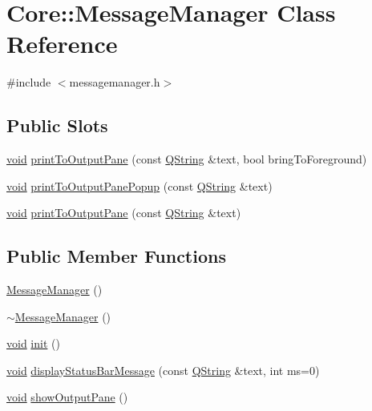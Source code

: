 \hypertarget{class_core_1_1_message_manager}{\section{\-Core\-:\-:\-Message\-Manager \-Class \-Reference}
\label{class_core_1_1_message_manager}
}


{\ttfamily \#include $<$messagemanager.\-h$>$}

\subsection*{\-Public \-Slots}
\begin{DoxyCompactItemize}
\item 
\hyperlink{group___u_a_v_objects_plugin_ga444cf2ff3f0ecbe028adce838d373f5c}{void} \hyperlink{group___core_plugin_ga909deae01f2b3748fe8ac76443102d32}{print\-To\-Output\-Pane} (const \hyperlink{group___u_a_v_objects_plugin_gab9d252f49c333c94a72f97ce3105a32d}{\-Q\-String} \&text, bool bring\-To\-Foreground)
\item 
\hyperlink{group___u_a_v_objects_plugin_ga444cf2ff3f0ecbe028adce838d373f5c}{void} \hyperlink{group___core_plugin_ga2dc4635e01c834a7d118528d7bb077e2}{print\-To\-Output\-Pane\-Popup} (const \hyperlink{group___u_a_v_objects_plugin_gab9d252f49c333c94a72f97ce3105a32d}{\-Q\-String} \&text)
\item 
\hyperlink{group___u_a_v_objects_plugin_ga444cf2ff3f0ecbe028adce838d373f5c}{void} \hyperlink{group___core_plugin_gac367c5893851aab11c5d00c81494940a}{print\-To\-Output\-Pane} (const \hyperlink{group___u_a_v_objects_plugin_gab9d252f49c333c94a72f97ce3105a32d}{\-Q\-String} \&text)
\end{DoxyCompactItemize}
\subsection*{\-Public \-Member \-Functions}
\begin{DoxyCompactItemize}
\item 
\hyperlink{group___core_plugin_gaf8bf800ee9a6a8e723a8062d740c9d50}{\-Message\-Manager} ()
\item 
\hyperlink{group___core_plugin_ga4b5866d0faa20904470a48a6ba5f6eab}{$\sim$\-Message\-Manager} ()
\item 
\hyperlink{group___u_a_v_objects_plugin_ga444cf2ff3f0ecbe028adce838d373f5c}{void} \hyperlink{group___core_plugin_ga87092893657c545a84d8d274fbe9796f}{init} ()
\item 
\hyperlink{group___u_a_v_objects_plugin_ga444cf2ff3f0ecbe028adce838d373f5c}{void} \hyperlink{group___core_plugin_ga63a31179d9d4b427bcb9fb19f9ead31c}{display\-Status\-Bar\-Message} (const \hyperlink{group___u_a_v_objects_plugin_gab9d252f49c333c94a72f97ce3105a32d}{\-Q\-String} \&text, int ms=0)
\item 
\hyperlink{group___u_a_v_objects_plugin_ga444cf2ff3f0ecbe028adce838d373f5c}{void} \hyperlink{group___core_plugin_gabe6c93254cf37ff7c22cf9622fd9bf81}{show\-Output\-Pane} ()
\end{DoxyCompactItemize}
